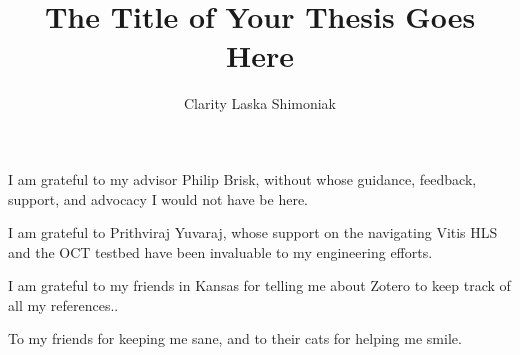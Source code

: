 \documentclass[oneside,final, letterpaper]{ucr}
\begin{document}

\title{The Title of Your Thesis Goes Here}
\author{Clarity Laska Shimoniak}

\maketitle
\copyrightpage{}
\approvalpage{}


\begin{frontmatter}

\begin{acknowledgements}
I am grateful to my advisor Philip Brisk, without whose guidance, feedback,
support, and advocacy I would not have be here.

I am grateful to Prithviraj Yuvaraj, whose support on the navigating Vitis HLS
and the OCT testbed have been invaluable to my engineering efforts.

I am grateful to my friends in Kansas for telling me about Zotero to keep track
of all my references..
\end{acknowledgements}

\begin{dedication}
\null\vfil
{\large
\begin{center}
To my friends for keeping me sane, and to their cats for helping me smile.
\end{center}}
\vfil\null
\end{dedication}



\tableofcontents
\listoffigures
\listoftables
\end{frontmatter}











\nocite{*}
% 
\printbibliography


\end{document}
